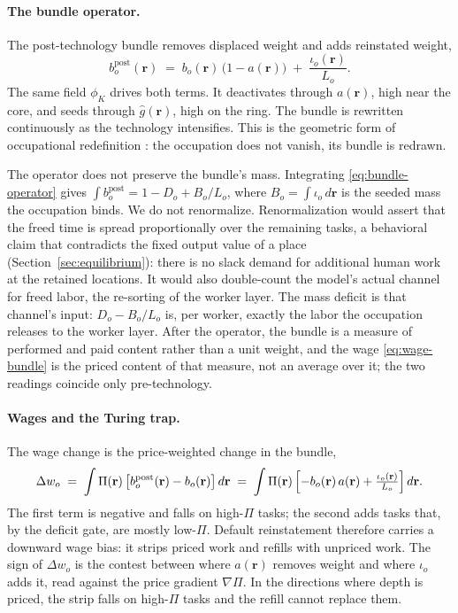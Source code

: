 \documentclass[12pt, a4paper]{article}
\begin{document}
\paragraph{The bundle operator.}
The post-technology bundle removes displaced weight and adds reinstated
weight,
\begin{equation}
  b_o^{\text{post}}(\mathbf{r})
  \;=\;
  b_o(\mathbf{r})\,\bigl(1 - a(\mathbf{r})\bigr)
  \;+\;
  \frac{\iota_o(\mathbf{r})}{L_o}.
  \label{eq:bundle-operator}
\end{equation}
The same field $\phi_K$ drives both terms. It deactivates through
$a(\mathbf{r})$, high near the core, and seeds through
$\hat{g}(\mathbf{r})$, high on the ring. The bundle is rewritten
continuously as the technology intensifies. This is the geometric form
of occupational redefinition \parencite{brynjolfsson2018mlworkforce}:
the occupation does not vanish, its bundle is redrawn.

The operator does not preserve the bundle's mass. Integrating
\eqref{eq:bundle-operator} gives
$\int b_o^{\text{post}} = 1 - D_o + B_o/L_o$, where
$B_o = \int \iota_o\, d\mathbf{r}$ is the seeded mass the occupation
binds. We do not renormalize. Renormalization would assert that the
freed time is spread proportionally over the remaining tasks, a
behavioral claim that contradicts the fixed output value of a place
(Section~\ref{sec:equilibrium}): there is no slack demand for
additional human work at the retained locations. It would also
double-count the model's actual channel for freed labor, the
re-sorting of the worker layer. The mass deficit is that channel's
input: $D_o - B_o/L_o$ is, per worker, exactly the labor the
occupation releases to the worker layer. After the operator, the
bundle is a measure of performed and paid content rather than a unit
weight, and the wage \eqref{eq:wage-bundle} is the priced content of
that measure, not an average over it; the two readings coincide only
pre-technology.

\paragraph{Wages and the Turing trap.}
The wage change is the price-weighted change in the bundle,
\begin{equation}
  \Delta w_o
  \;=\;
  \int \Pi(\mathbf{r})\,
  \bigl[b_o^{\text{post}}(\mathbf{r}) - b_o(\mathbf{r})\bigr]\,
  d\mathbf{r}
  \;=\;
  \int \Pi(\mathbf{r})\,
  \Bigl[-b_o(\mathbf{r})\,a(\mathbf{r})
  + \tfrac{\iota_o(\mathbf{r})}{L_o}\Bigr]\, d\mathbf{r}.
  \label{eq:wage-change}
\end{equation}
The first term is negative and falls on high-$\Pi$ tasks; the second
adds tasks that, by the deficit gate, are mostly low-$\Pi$. Default
reinstatement therefore carries a downward wage bias: it strips priced
work and refills with unpriced work. The sign of $\Delta w_o$ is the
contest between where $a(\mathbf{r})$ removes weight and where
$\iota_o$ adds it, read against the price gradient $\nabla\Pi$. In the
directions where depth is priced, the strip falls on high-$\Pi$ tasks
and the refill cannot replace them.
\end{document}
